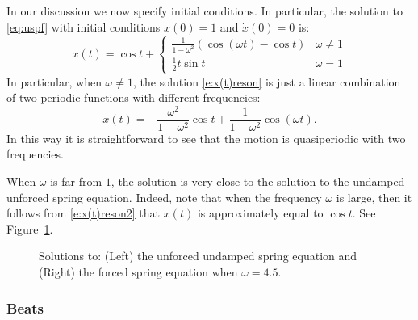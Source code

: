 \documentclass{ximera}
\begin{document}
In our discussion we now specify initial conditions.  In particular, the 
solution to \eqref{eq:uspf} with initial conditions $x(0)=1$ and 
$\dot{x}(0)=0$ is:
\arraystart
\begin{equation}  \label{e:x(t)reson}
x(t) = \cos t + \left\{\begin{array}{ll}
\frac{1}{1-\omega ^2}(\cos(\omega t)-\cos t) & \omega \neq 1 \\
\frac{1}{2}t\sin t & \omega=1  \end{array}\right.
\end{equation}
\arrayfinish
In particular, when $\omega\neq 1$, the solution \eqref{e:x(t)reson} is
just a linear combination of two periodic 
functions with different 
frequencies:
\begin{equation} \label{e:x(t)reson2}
x(t) = -\frac{\omega^2}{1-\omega ^2} \cos t + \frac{1}{1-\omega ^2}\cos(\omega t).
\end{equation}
In this way it is straightforward to see that the motion is 
quasiperiodic
with two frequencies.

When $\omega$ is far from $1$, the solution is very close to the solution
to the undamped unforced spring equation.  
Indeed, note that when the frequency
$\omega$ is large, then it follows from \eqref{e:x(t)reson2} that $x(t)$ is 
approximately equal to $\cos t$.  See Figure~\ref{F:nonreson}.
\begin{figure}[htb]
           \centerline{%
           }
           \caption{Solutions to: (Left) the unforced undamped spring
        equation and (Right) the forced spring equation when $\omega =4.5$.}
           \label{F:nonreson}
\end{figure}

\subsubsection*{Beats}
\end{document}
